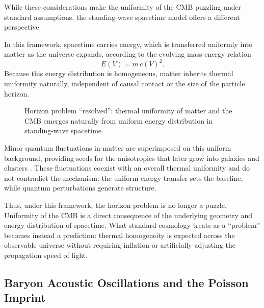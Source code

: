 \documentclass[12pt]{article}
\begin{document}
While these considerations make the uniformity of the CMB puzzling under standard assumptions, the standing-wave spacetime model offers a different perspective.

In this framework, spacetime carries energy, which is transferred uniformly into matter as the universe expands, according to the evolving mass-energy relation
\begin{equation}
E(V) = m\,c(V)^2.
\end{equation}
Because this energy distribution is homogeneous, matter inherits thermal uniformity naturally, independent of causal contact or the size of the particle horizon.

\begin{figure}[h!]
\centering
{}
\caption{Horizon problem “resolved”: thermal uniformity of matter and the CMB emerges naturally from uniform energy distribution in standing-wave spacetime.}
\label{fig:horizon_flow}
\end{figure}

Minor quantum fluctuations in matter are superimposed on this uniform background, providing seeds for the anisotropies that later grow into galaxies and clusters \cite{mukhanov1992}. These fluctuations coexist with an overall thermal uniformity and do not contradict the mechanism: the uniform energy transfer sets the baseline, while quantum perturbations generate structure.

Thus, under this framework, the horizon problem is no longer a puzzle. Uniformity of the CMB is a direct consequence of the underlying geometry and energy distribution of spacetime. What standard cosmology treats as a “problem” becomes instead a prediction: thermal homogeneity is expected across the observable universe without requiring inflation or artificially adjusting the propagation speed of light.

\subsection{Baryon Acoustic Oscillations and the Poisson Imprint}
\end{document}
